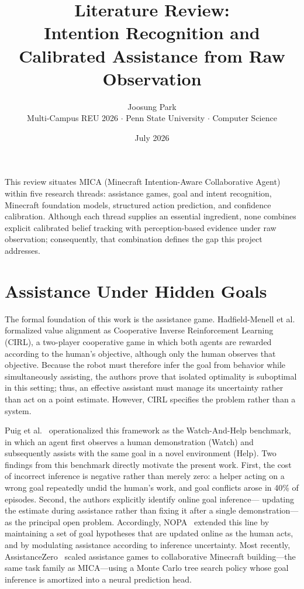 \documentclass[12pt]{article}
\title{Literature Review:\\ Intention Recognition and Calibrated Assistance from Raw Observation}
\author{Joosung Park\\ \small Multi-Campus REU 2026 $\cdot$ Penn State University $\cdot$ Computer Science}
\date{July 2026}
\begin{document}
\maketitle

\noindent
This review situates MICA (Minecraft Intention-Aware Collaborative Agent) within
five research threads: assistance games, goal and intent recognition, Minecraft
foundation models, structured action prediction, and confidence calibration.
Although each thread supplies an essential ingredient, none combines explicit
calibrated belief tracking with perception-based evidence under raw observation;
consequently, that combination defines the gap this project addresses.

\section{Assistance Under Hidden Goals}

The formal foundation of this work is the assistance game. Hadfield-Menell et
al.~\cite{cirl} formalized value alignment as Cooperative Inverse Reinforcement
Learning (CIRL), a two-player cooperative game in which both agents are rewarded
according to the human's objective, although only the human observes that
objective. Because the robot must therefore infer the goal from behavior while
simultaneously assisting, the authors prove that isolated optimality is
suboptimal in this setting; thus, an effective assistant must manage its
uncertainty rather than act on a point estimate. However, CIRL specifies the
problem rather than a system.

Puig et al.~\cite{wah} operationalized this framework as the Watch-And-Help
benchmark, in which an agent first observes a human demonstration (Watch) and
subsequently assists with the same goal in a novel environment (Help). Two
findings from this benchmark directly motivate the present work. First, the cost
of incorrect inference is negative rather than merely zero: a helper acting on a
wrong goal repeatedly undid the human's work, and goal conflicts arose in 40\%
of episodes. Second, the authors explicitly identify online goal inference---
updating the estimate during assistance rather than fixing it after a single
demonstration---as the principal open problem. Accordingly, NOPA~\cite{nopa}
extended this line by maintaining a set of goal hypotheses that are updated
online as the human acts, and by modulating assistance according to inference
uncertainty. Most recently, AssistanceZero~\cite{assistancezero} scaled
assistance games to collaborative Minecraft building---the same task family as
MICA---using a Monte Carlo tree search policy whose goal inference is amortized
into a neural prediction head.
\end{document}

